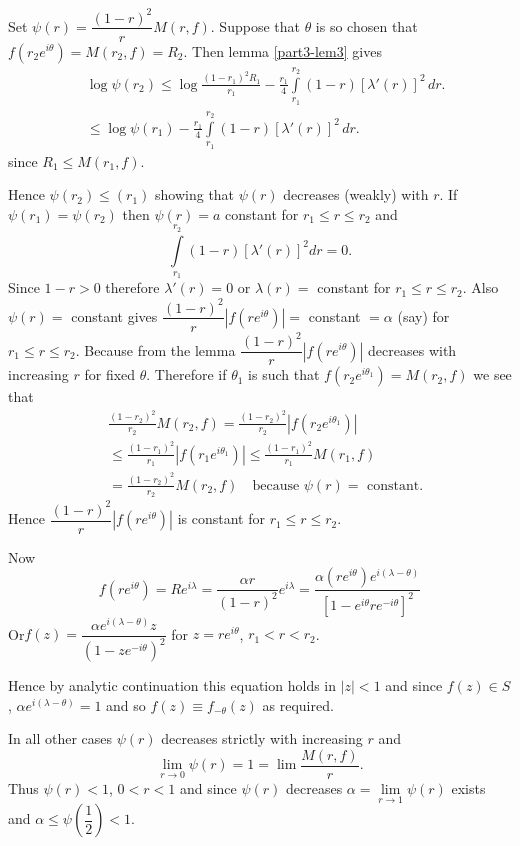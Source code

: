 \begin{proofofthm}\label{proofofthm9}
Set $\psi(r)=\dfrac{(1-r)^{2}}{r}M(r,f)$. Suppose that $\theta$ is so
chosen that $f(r_{2}e^{i\theta})=M(r_{2},f)=R_{2}$. Then lemma
\ref{part3-lem3} gives
\begin{align*}
& \log \psi(r_{2})\leq \log
\frac{(1-r_{1})^{2}R_{1}}{r_{1}}-\frac{r_{1}}{4}\int\limits^{r_{2}}_{r_{1}}(1-r)[\lambda'(r)]^{2}\,dr.\\
& \leq \log\psi(r_{1})-\frac{r_{1}}{4} \int\limits^{r_{2}}_{r_{1}}
(1-r)[\lambda'(r)]^{2}\,dr. 
\end{align*}\pageoriginale
since $R_{1}\leq M(r_{1},f)$.

Hence $\psi(r_{2})\leq (r_{1})$ showing that $\psi(r)$ decreases
(weakly) with $r$. If $\psi(r_{1})=\psi(r_{2})$ then $\psi(r)=a$
constant for $r_{1}\leq r\leq r_{2}$ and
$$
\int\limits^{r_{2}}_{r_{1}}(1-r)[\lambda'(r)]^{2}dr=0.
$$
Since $1-r>0$ therefore $\lambda'(r)=0$ or $\lambda(r)=$ constant for
$r_{1}\leq r\leq r_{2}$. Also $\psi(r)=$ constant gives
$\dfrac{(1-r)^{2}}{r}|f(re^{i\theta})|=$ constant $=\alpha$ (say) for
$r_{1}\leq r\leq r_{2}$. Because from the lemma
$\dfrac{(1-r)^{2}}{r}|f(re^{i\theta})|$ decreases with increasing $r$
for fixed $\theta$. Therefore if $\theta_{1}$ is such that
$f(r_{2}e^{i\theta_{1}})=M(r_{2},f)$ we see that
\begin{align*}
&\frac{(1-r_{2})^{2}}{r_{2}}M(r_{2},f)=\frac{(1-r_{2})^{2}}{r_{2}}|f(r_{2}e^{i\theta_{1}})|\\
&\leq \frac{(1-r_{1})^{2}}{r_{1}}|f(r_{1}e^{i\theta_{1}})|\leq
  \frac{(1-r_{1})^{2}}{r_{1}}M(r_{1},f)\\
&= \frac{(1-r_{2})^{2}}{r_{2}}M(r_{2},f)\quad\text{because } \psi(r)
  =\text{ constant.}
\end{align*}
Hence $\dfrac{(1-r)^{2}}{r}|f(re^{i\theta})|$ is constant for
$r_{1}\leq r\leq r_{2}$.

Now 
$$
f(re^{i\theta})=Re^{i\lambda}=\frac{\alpha
  r}{(1-r)^{2}}e^{i\lambda}=\frac{\alpha (re^{i\theta})e^{i(\lambda-\theta)}}{[1-e^{i\theta}re^{-i\theta}]^{2}}
$$
Or\pageoriginale $f(z)=\dfrac{\alpha
  e^{i(\lambda-\theta)}z}{(1-ze^{-i\theta})^{2}}$ 
for $z=re^{i\theta}$, $r_{1}<r<r_{2}$.

Hence by analytic continuation this equation holds in $|z|<1$ and
since $f(z)\in S$, $\alpha e^{i(\lambda-\theta)}=1$ and so $f(z)\equiv
f_{-\theta}(z)$ as required.
\end{proofofthm}

In all other cases $\psi(r)$ decreases strictly with increasing $r$
and
$$
\lim\limits_{r\to 0}\psi(r)=1=\lim \frac{M(r,f)}{r}.
$$
Thus $\psi(r)<1$, $0<r<1$ and since $\psi(r)$ decreases
$\alpha=\lim\limits_{r\to 1}\psi(r)$ exists and $\alpha\leq
\psi \left(\dfrac{1}{2} \right)<1$. 

